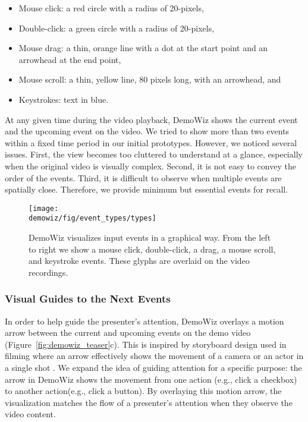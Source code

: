 \begin{itemize}
  \itemsep -2pt
  \item Mouse click: a red circle with a radius of 20-pixels,
  \item Double-click: a green circle with a radius of 20-pixels,
  \item Mouse drag: a thin, orange line with a dot at the start point and an arrowhead at the end point,
  \item Mouse scroll: a thin, yellow line, 80 pixels long, with an arrowhead, and
  \item Keystrokes: text in blue.
\end{itemize}

At any given time during the video playback, DemoWiz shows the current event and the upcoming event on the video. We tried to show more than two events within a fixed time period in our initial prototypes. However, we noticed several issues. First, the view becomes too cluttered to understand at a glance, especially when the original video is visually complex. Second, it is not easy to convey the order of the events. Third, it is difficult to observe when multiple events are spatially close. Therefore, we provide minimum but essential events for recall.

\begin{figure*}[t]
  \centering
  \texttt{[image: \\demowiz/fig/event\_types/types]}
  \caption{DemoWiz visualizes input events in a graphical way. From the left to right we show a mouse click, double-click, a drag, a mouse scroll, and keystroke events. These glyphs are overlaid on the video recordings.}
  \label{fig:demowiz_glyphs}
\end{figure*}


\subsubsection{Visual Guides to the Next Events}
In order to help guide the presenter's attention, DemoWiz overlays a motion arrow between the current and upcoming events on the demo video (Figure~\ref{fig:demowiz_teaser}c). This is inspired by storyboard design used in filming where an arrow effectively shows the movement of a camera or an actor in a single shot \cite{goldman2006schematic}. We expand the idea of guiding attention for a specific purpose: the arrow in DemoWiz shows the movement from one action (e.g., click a checkbox) to another action(e.g., click a button). By overlaying this motion arrow, the visualization matches the flow of a presenter's attention when they observe the video content.

